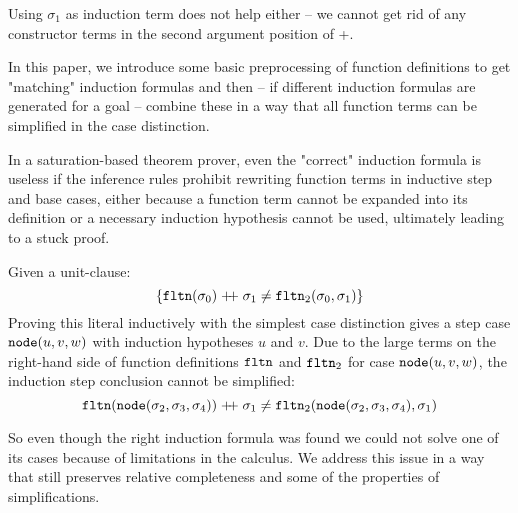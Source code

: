 \begin{example}
Using $\sigma_1$ as induction term does not help either -- we cannot get rid of any constructor terms in the second argument position of +.
\end{example}
In this paper, we introduce some basic preprocessing of function definitions to get "matching" induction formulas and then -- if different induction formulas are generated for a goal -- combine these in a way that all function terms can be simplified in the case distinction.

In a saturation-based theorem prover, even the "correct" induction formula is useless if the inference rules prohibit rewriting function terms in inductive step and base cases, either because a function term cannot be expanded into its definition or a necessary induction hypothesis cannot be used, ultimately leading to a stuck proof.
\begin{example}
	Given a unit-clause:
	$$\{\mathtt{fltn}(\sigma_0)\mathrel{ +\hspace{-1mm}+ }\sigma_1\neq\mathtt{fltn}_2(\sigma_0,\sigma_1)\}$$
	Proving this literal inductively with the simplest case distinction gives a step case $\mathtt{node}(u,v,w)$ with induction hypotheses $u$ and $v$. Due to the large terms on the right-hand side of function definitions $\mathtt{fltn}$ and $\mathtt{fltn}_2$ for case $\mathtt{node}(u,v,w)$, the induction step conclusion cannot be simplified:
	$$\mathtt{fltn}(\mathtt{node}(\sigma_2,\sigma_3,\sigma_4))\mathrel{ +\hspace{-1mm}+ }\sigma_1\neq\mathtt{fltn}_2(\mathtt{node}(\sigma_2,\sigma_3,\sigma_4),\sigma_1)$$
\end{example}
So even though the right induction formula was found we could not solve one of its cases because of limitations in the calculus. We address this issue in a way that still preserves relative completeness and some of the properties of simplifications.
